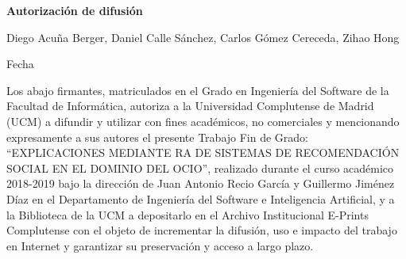 
\newpage

\thispagestyle{empty}

\begin{center}

{\bf \Huge Autorización de difusión}

\vspace{1cm}


     Diego Acuña Berger, Daniel Calle Sánchez, Carlos Gómez Cereceda, Zihao Hong\\

   \vspace{0.5cm}


   Fecha\\

   \vspace{0.5cm}
   \end{center}
   
Los abajo firmantes, matriculados en el Grado en Ingeniería del Software de la Facultad de Informática, autoriza a la Universidad Complutense de Madrid (UCM) a difundir y utilizar con fines académicos, no comerciales y mencionando expresamente a sus autores el presente Trabajo Fin de Grado: “EXPLICACIONES MEDIANTE RA DE SISTEMAS DE RECOMENDACIÓN SOCIAL EN EL DOMINIO DEL OCIO”, realizado durante el curso académico 2018-2019 bajo la dirección de Juan Antonio Recio García y Guillermo Jiménez Díaz en el Departamento de Ingeniería del Software e Inteligencia Artificial, y a la Biblioteca de la UCM a depositarlo en el Archivo Institucional E-Prints Complutense con el objeto de incrementar la difusión, uso e impacto del trabajo en Internet y garantizar su preservación y acceso a largo plazo.

